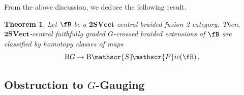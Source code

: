 \documentclass[11pt,reqno]{amsart}
\newcommand{\rB}{\mathrm{B}}
\numberwithin{equation}{section}
\theoremstyle{plain}
\newtheorem{thm}[equation]{Theorem}
\theoremstyle{definition}
\begin{document}
\noindent From the above discussion, we deduce the following result.

\begin{thm}\label{thm:FGSET}
    Let $\fB$ be a $\mathbf{2SVect}$-central braided fusion 2-category. Then, $\mathbf{2SVect}$-central faithfully graded $G$-crossed braided extensions of $\fB$ are classified by homotopy classes of maps 
    \begin{equation}
        \rB G \rightarrow \rB \mathscr{S}\!\mathscr{P}ic( \fB )\,.
    \end{equation}
\end{thm}

\subsection{Obstruction to $G$-Gauging}\label{subsection:obstructiongauging}
\end{document}
